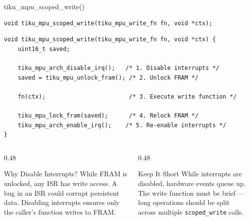 \documentclass[aspectratio=169, 10pt]{beamer}
\begin{document}
\begin{frame}[fragile]{tiku\_mpu\_scoped\_write()}
\begin{lstlisting}[style=cstyle]
void tiku_mpu_scoped_write(tiku_mpu_write_fn fn, void *ctx);
\end{lstlisting}

\begin{lstlisting}[style=cstyle, title={kernel/memory/tiku\_mpu.c}]
void tiku_mpu_scoped_write(tiku_mpu_write_fn fn, void *ctx) {
    uint16_t saved;

    tiku_mpu_arch_disable_irq();   /* 1. Disable interrupts */
    saved = tiku_mpu_unlock_fram(); /* 2. Unlock FRAM */

    fn(ctx);                        /* 3. Execute write function */

    tiku_mpu_lock_fram(saved);      /* 4. Relock FRAM */
    tiku_mpu_arch_enable_irq();    /* 5. Re-enable interrupts */
}
\end{lstlisting}

\vspace{0.3em}
\begin{columns}[T]
\begin{column}{0.48\textwidth}
\begin{alertblock}{Why Disable Interrupts?}
While FRAM is unlocked, any ISR has write access.
A bug in an ISR could corrupt persistent data.
Disabling interrupts ensures only the caller's
function writes to FRAM.
\end{alertblock}
\end{column}
\begin{column}{0.48\textwidth}
\begin{alertblock}{Keep It Short}
While interrupts are disabled, hardware events
queue up. The write function must be brief ---
long operations should be split across multiple
\texttt{scoped\_write} calls.
\end{alertblock}
\end{column}
\end{columns}
\end{frame}
\end{document}
